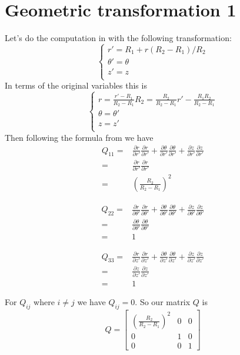 \documentclass{amsart}
\begin{document}
\section{Geometric transformation 1}
Let's do the computation in \cite{ward96} with the following transformation:
\[\begin{cases}
r'=R_1+r(R_2-R_1)/R_2\\
\theta'=\theta\\
z'=z\\
\end{cases}\]
In terms of the original variables this is
\[\begin{cases}
r=\frac{r'-R_1}{R_2-R_1}R_2=\frac{R_2}{R_2-R_1}r'-\frac{R_1R_2}{R_2-R_1}\\
\theta=\theta'\\
z=z'\\
\end{cases}\]
Then following the formula from \cite{ward96} we have
\begin{align*}
Q_{11}
=&\frac{\partial r}{\partial r'}\frac{\partial r}{\partial r'}
+\frac{\partial \theta}{\partial r'}\frac{\partial \theta}{\partial r'}
+\frac{\partial z}{\partial r'}\frac{\partial z}{\partial r'}\\
=&\frac{\partial r}{\partial r'}\frac{\partial r}{\partial r'}\\
=&\left(\frac{R_2}{R_2-R_1}\right)^2
\end{align*}

\begin{align*}
Q_{22}
=&\frac{\partial r}{\partial \theta'}\frac{\partial r}{\partial \theta'}
+\frac{\partial \theta}{\partial \theta'}\frac{\partial \theta}{\partial \theta'}
+\frac{\partial z}{\partial \theta'}\frac{\partial z}{\partial \theta'}\\
=&\frac{\partial \theta}{\partial \theta'}\frac{\partial \theta}{\partial \theta'}\\
=&1
\end{align*}

\begin{align*}
Q_{33}
=&\frac{\partial r}{\partial z'}\frac{\partial r}{\partial z'}
+\frac{\partial \theta}{\partial z'}\frac{\partial \theta}{\partial z'}
+\frac{\partial z}{\partial z'}\frac{\partial z}{\partial z'}\\
=&\frac{\partial z}{\partial z'}\frac{\partial z}{\partial z'}\\
=&1
\end{align*}

For $Q_{ij}$ where $i\neq j$ we have $Q_{ij}=0$. So our matrix $Q$ is
\[
  Q=\begin{bmatrix}
    \left(\frac{R_2}{R_2-R_1}\right)^2 & 0 & 0\\
    0 & 1 & 0\\
    0 & 0 & 1
  \end{bmatrix}
\]
\end{document}
